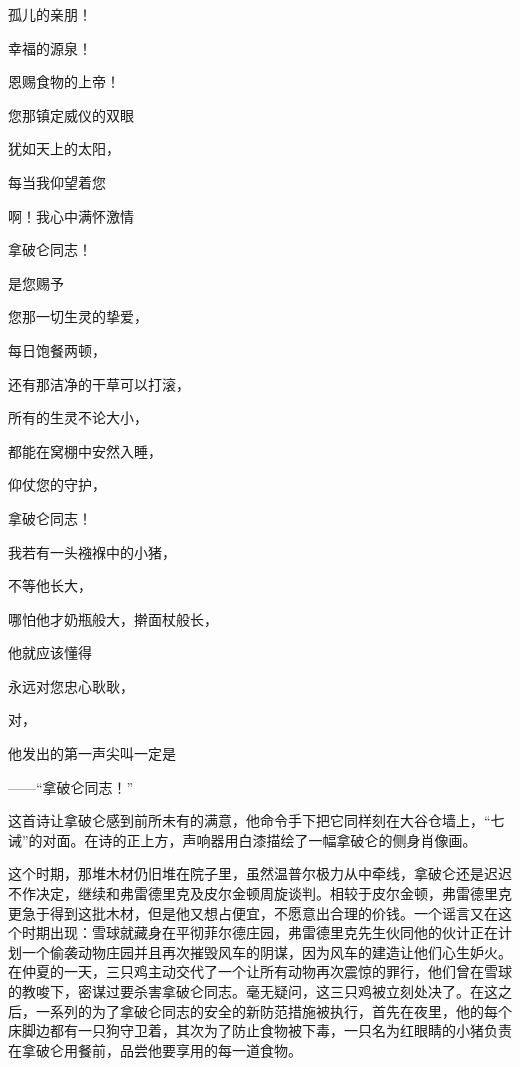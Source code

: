 孤儿的亲朋！

幸福的源泉！

恩赐食物的上帝！

您那镇定威仪的双眼

犹如天上的太阳，

每当我仰望着您

啊！我心中满怀激情

拿破仑同志！

是您赐予

您那一切生灵的挚爱，

每日饱餐两顿，

还有那洁净的干草可以打滚，

所有的生灵不论大小，

都能在窝棚中安然入睡，

仰仗您的守护，

拿破仑同志！

我若有一头襁褓中的小猪，

不等他长大，

哪怕他才奶瓶般大，擀面杖般长，

他就应该懂得

永远对您忠心耿耿，

对，

他发出的第一声尖叫一定是

——“拿破仑同志！”

这首诗让拿破仑感到前所未有的满意，他命令手下把它同样刻在大谷仓墙上，“七诫”的对面。在诗的正上方，声响器用白漆描绘了一幅拿破仑的侧身肖像画。

这个时期，那堆木材仍旧堆在院子里，虽然温普尔极力从中牵线，拿破仑还是迟迟不作决定，继续和弗雷德里克及皮尔金顿周旋谈判。相较于皮尔金顿，弗雷德里克更急于得到这批木材，但是他又想占便宜，不愿意出合理的价钱。一个谣言又在这个时期出现：雪球就藏身在平彻菲尔德庄园，弗雷德里克先生伙同他的伙计正在计划一个偷袭动物庄园并且再次摧毁风车的阴谋，因为风车的建造让他们心生妒火。在仲夏的一天，三只鸡主动交代了一个让所有动物再次震惊的罪行，他们曾在雪球的教唆下，密谋过要杀害拿破仑同志。毫无疑问，这三只鸡被立刻处决了。在这之后，一系列的为了拿破仑同志的安全的新防范措施被执行，首先在夜里，他的每个床脚边都有一只狗守卫着，其次为了防止食物被下毒，一只名为红眼睛的小猪负责在拿破仑用餐前，品尝他要享用的每一道食物。

